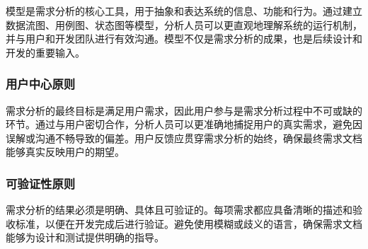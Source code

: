 模型是需求分析的核心工具，用于抽象和表达系统的信息、功能和行为。通过建立数据流图、用例图、状态图等模型，分析人员可以更直观地理解系统的运行机制，并与用户和开发团队进行有效沟通。模型不仅是需求分析的成果，也是后续设计和开发的重要输入。

\subsubsection{用户中心原则}

需求分析的最终目标是满足用户需求，因此用户参与是需求分析过程中不可或缺的环节。通过与用户密切合作，分析人员可以更准确地捕捉用户的真实需求，避免因误解或沟通不畅导致的偏差。用户反馈应贯穿需求分析的始终，确保最终需求文档能够真实反映用户的期望。

\subsubsection{可验证性原则}

需求分析的结果必须是明确、具体且可验证的。每项需求都应具备清晰的描述和验收标准，以便在开发完成后进行验证。避免使用模糊或歧义的语言，确保需求文档能够为设计和测试提供明确的指导。